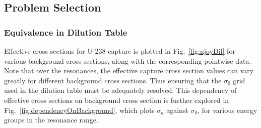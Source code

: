 \documentclass[10pt]{article}
\begin{document}
\subsection{Problem Selection}

\subsubsection{Equivalence in Dilution Table}

Effective cross sections for U-238 capture is plotted in Fig.~\ref{fig:njoyDil} for various background cross sections, along with the corresponding pointwise data. Note that over the resonances, the effective capture cross section values can vary greatly for different background cross sections. Thus ensuring that the $\sigma_0$ grid used in the dilution table must be adequately resolved. This dependency of effective cross sections on background cross section is further explored in Fig.~\ref{fig:dependencyOnBackground}, which plots $\sigma_a$ against $\sigma_0$, for various energy groups in the resonance range. 
\end{document}
